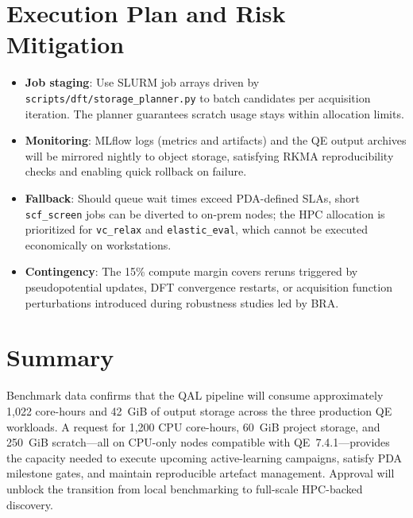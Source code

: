 \documentclass[11pt]{article}
\begin{document}
\section*{Execution Plan and Risk Mitigation}
\begin{itemize}[leftmargin=1.5em]
  \item \textbf{Job staging}: Use SLURM job arrays driven by \texttt{scripts/dft/storage\_planner.py} to batch candidates per acquisition iteration. The planner guarantees scratch usage stays within allocation limits.
  \item \textbf{Monitoring}: MLflow logs (metrics and artifacts) and the QE output archives will be mirrored nightly to object storage, satisfying RKMA reproducibility checks and enabling quick rollback on failure.
  \item \textbf{Fallback}: Should queue wait times exceed PDA-defined SLAs, short \texttt{scf\_screen} jobs can be diverted to on-prem nodes; the HPC allocation is prioritized for \texttt{vc\_relax} and \texttt{elastic\_eval}, which cannot be executed economically on workstations.
  \item \textbf{Contingency}: The 15\% compute margin covers reruns triggered by pseudopotential updates, DFT convergence restarts, or acquisition function perturbations introduced during robustness studies led by BRA.
\end{itemize}

\section*{Summary}
Benchmark data confirms that the QAL pipeline will consume approximately 1{,}022 core-hours and 42~GiB of output storage across the three production QE workloads. A request for 1{,}200 CPU core-hours, 60~GiB project storage, and 250~GiB scratch---all on CPU-only nodes compatible with QE~7.4.1---provides the capacity needed to execute upcoming active-learning campaigns, satisfy PDA milestone gates, and maintain reproducible artefact management. Approval will unblock the transition from local benchmarking to full-scale HPC-backed discovery.
\end{document}
